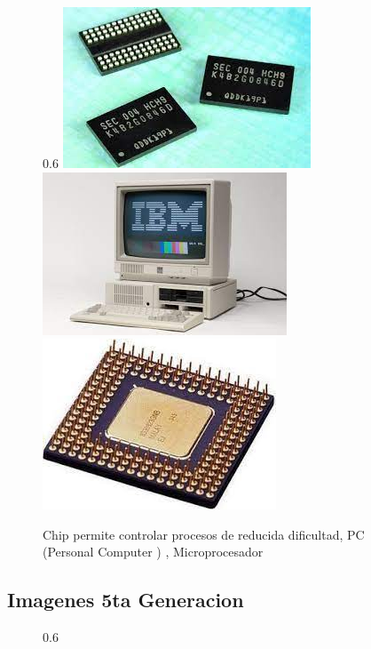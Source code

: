 \documentclass[11pt]{article}
\begin{document}
\begin{multicols}{2}
\begin{figure}{0.6\linewidth}
  \centering
  \includegraphics[width=0.3\linewidth]{chip.jpeg}
  \includegraphics[width=0.3\linewidth]{pc.jpeg}
  \includegraphics[width=0.3\linewidth]{microprocesor.jpeg}
    \caption{Chip permite controlar procesos de reducida dificultad, PC (Personal Computer ) , Microprocesador}
  
  \end{figure} 
  
  \subsection{Imagenes 5ta Generacion}

  \begin{figure}{0.6\linewidth}
  

\end{figure}
\end{multicols}
\end{document}
